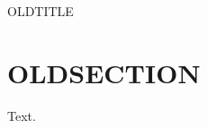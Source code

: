 \documentclass{article}
\begin{document}
\begin{frame}{OLDTITLE}
  \tableofcontents
\end{frame}
\section{OLDSECTION}
Text.
\end{document}
